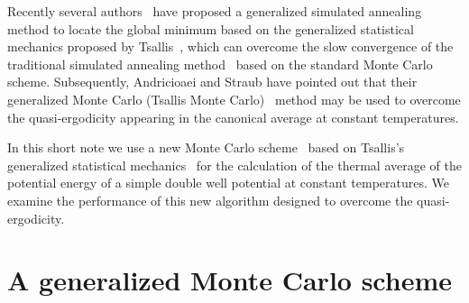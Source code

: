 Recently several authors~\cite{Pe,TS,AS1} have proposed a
generalized simulated annealing method to locate the global
minimum based on the generalized statistical mechanics
proposed by Tsallis~\cite{Ts}, which can overcome the slow
convergence of the traditional simulated annealing
method~\cite{KGV} based on the standard Monte Carlo scheme.
Subsequently, Andricioaei and Straub have pointed out that
their generalized Monte Carlo (Tsallis Monte Carlo)~\cite{AS2}
method may be used to overcome the quasi-ergodicity appearing
in the canonical average at constant temperatures.

In this short note we use a new Monte Carlo scheme~\cite{AS2,AS3,SA}
based on Tsallis's generalized statistical mechanics~\cite{TS}
for the calculation of the thermal average of the potential energy
of a simple double well potential at constant temperatures.
We examine the performance of this new algorithm designed to
overcome the quasi-ergodicity.

\section{A generalized Monte Carlo scheme}

